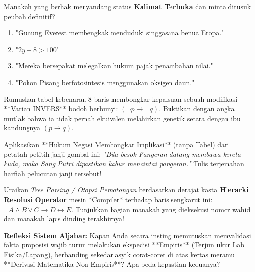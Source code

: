 \documentclass[../main]{subfiles}
\begin{document}
\begin{latihan}
  \item Manakah yang berhak menyandang status \textbf{Kalimat Terbuka} dan minta ditusuk peubah definitif?
    \begin{enumerate}
        \item "Gunung Everest membengkak menduduki singgasana benua Eropa."
        \item "$2y + 8 > 100$"
        \item "Mereka bersepakat melegalkan hukum pajak penambahan nilai."
        \item "Pohon Pisang berfotosintesis menggunakan oksigen daun."
    \end{enumerate}
  \item Rumuskan tabel kebenaran 8-baris membongkar kepalsuan sebuah modifikasi **Varian INVERS** bodoh berbunyi: $(\neg p \rightarrow \neg q)$. Buktikan dengan angka mutlak bahwa ia tidak pernah ekuivalen melahirkan genetik setara dengan ibu kandungnya $(p \rightarrow q)$.
  \item Aplikasikan **Hukum Negasi Membongkar Implikasi** (tanpa Tabel) dari petatah-petitih janji gombal ini: \textit{"Bila besok Pangeran datang membawa kereta kuda, maka Sang Putri dipastikan kabur mencintai pangeran."} Tulis terjemahan harfiah pelucutan janji tersebut!
  \item Uraikan \textit{Tree Parsing / Otopsi Pemotongan} berdasarkan derajat kasta \textbf{Hierarki Resolusi Operator} mesin *Compiler* terhadap baris sengkarut ini:  $\neg A \wedge B \vee C \rightarrow D \leftrightarrow E$. Tunjukkan bagian manakah yang dieksekusi nomor wahid dan manakah lapis dinding terakhirnya!
  \item \textbf{Refleksi Sistem Aljabar:} Kapan Anda secara insting memutuskan memvalidasi fakta proposisi wajib turun melakukan ekspedisi **Empiris** (Terjun ukur Lab Fisika/Lapang), berbanding sekedar asyik corat-coret di atas kertas meramu **Derivasi Matematika Non-Empiris**? Apa beda kepastian keduanya?
\end{latihan}
\end{document}
